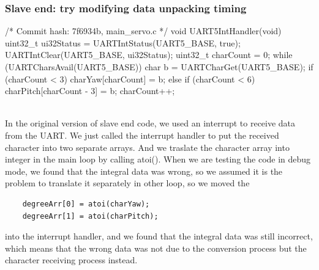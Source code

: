 \documentclass[12pt, a4paper]{article}
\begin{document}
\subsubsection{Slave end: try modifying data unpacking timing}\text{}
\begin{code}
/* Commit hash: 7f6934b, main_servo.c */
void UART5IntHandler(void) {
    uint32_t ui32Status = UARTIntStatus(UART5_BASE, true);
    UARTIntClear(UART5_BASE, ui32Status);
    uint32_t charCount = 0;
    while (UARTCharsAvail(UART5_BASE)) {
        char b = UARTCharGet(UART5_BASE);
        if (charCount < 3) {
            charYaw[charCount] = b;
        } else if (charCount < 6) {
            charPitch[charCount - 3] = b;
        }
        charCount++;
    }
}
\end{code}\text{}\\
In the original version of slave end code, we used an interrupt to receive data from the UART. 
We just called the interrupt handler to put the received character into two separate arrays. 
And we traslate the character array into integer in the main loop by calling atoi().
When we are testing the code in debug mode, we found that the integral data was wrong, 
so we assumed it is the problem to translate it separately in other loop, so we moved the 
\begin{verbatim}
    degreeArr[0] = atoi(charYaw);
    degreeArr[1] = atoi(charPitch);
\end{verbatim}
into the interrupt handler, and we found that the integral data was still incorrect, 
which means that the wrong data was not due to the conversion process but the character receiving process instead.
\end{document}
